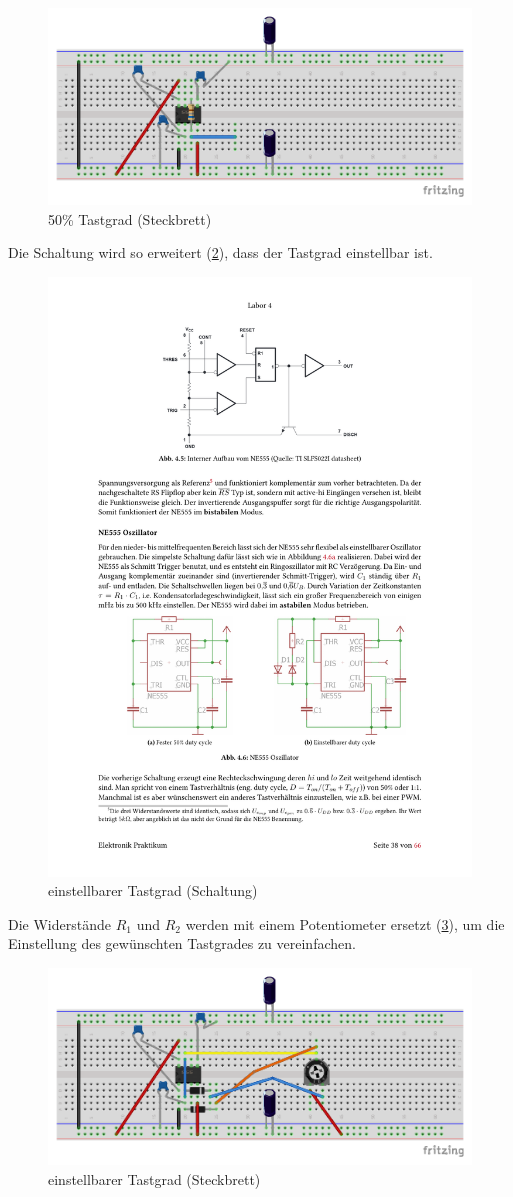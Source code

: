 \begin{figure}[H]
  \centering
  \includegraphics[width=0.5\linewidth]{Elektronik-Laborprotokoll_Filter/Abbildungen/Steckbrett_Bilder_Fritzing/Steckbrett_Aufgabe_2.1_NE555_1_bb.pdf}
  \caption{50\% Tastgrad (Steckbrett)}
  \label{fig:Steckbrett_NE555_1}
\end{figure}

Die Schaltung wird so erweitert (\ref{fig:astabiler_Modus_einstellbar}), dass der Tastgrad einstellbar ist.

\begin{figure}[H]
  \centering
  \includegraphics[width=0.5\linewidth]{Elektronik-Laborprotokoll_Filter/Abbildungen/Schaltungen_Skript/Schaltung_NE555_einstellbarer Tastgrad.pdf}
  \caption{einstellbarer Tastgrad (Schaltung)\cite{Skript}}
  \label{fig:astabiler_Modus_einstellbar}
\end{figure}

Die Widerstände $R_1$ und $R_2$ werden mit einem Potentiometer ersetzt (\ref{fig:Steckbrett_NE555_2}), um die Einstellung des gewünschten Tastgrades zu vereinfachen.

\begin{figure}[H]
  \centering
  \includegraphics[width=0.5\linewidth]{Elektronik-Laborprotokoll_Filter/Abbildungen/Steckbrett_Bilder_Fritzing/Steckbrett_Aufgabe_2.2_NE555_pm.pdf}
  \caption{einstellbarer Tastgrad (Steckbrett)}
  \label{fig:Steckbrett_NE555_2}
\end{figure}

